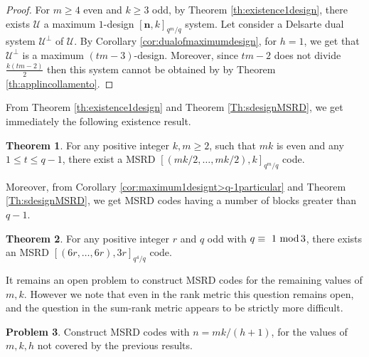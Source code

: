 \documentclass[11pt]{amsart}
\theoremstyle{definition}
\newtheorem{theorem}{Theorem}[section]
\newtheorem{open}[theorem]{Problem}
\newcommand{\U}{{\mathcal{U}}}
\newcommand{\bfn}{\mathbf {n}}
\renewcommand{\mod}{\hbox{{\rm mod}\,}}
\newcommand{\Fmnk}{[\bfn,k]_{q^m/q}}
\begin{document}
\begin{proof}
    For $m \geq 4$ even and $k \geq 3$ odd, by Theorem \ref{th:existence1design}, there exists $\U$ a maximum $1$-design $\Fmnk$ system. Let consider a Delsarte dual system $\mathcal{U}^{\perp}$ of $\U$. By Corollary \ref{cor:dualofmaximumdesign}, for $h=1$, we get that  $\mathcal{U}^{\perp}$ is a maximum $(tm-3)$-design. Moreover, since $tm-2$ does not divide $\frac{k(tm-2)}{2}$ then this system cannot be obtained by by Theorem \ref{th:applincollamento}.
\end{proof}

From Theorem \ref{th:existence1design} and Theorem \ref{Th:sdesignMSRD}, we get immediately the following existence result. %
\begin{theorem} 
    For any positive integer $k,m \geq 2$, such that $mk$ is even and any $1 \leq t \leq q-1$, there exist a MSRD $[(mk/2,\ldots,mk/2),k]_{q^m/q}$ code.
\end{theorem}

Moreover, from Corollary \ref{cor:maximum1designt>q-1particular} and Theorem \ref{Th:sdesignMSRD}, we get MSRD codes having a number of blocks greater than $q-1$.

\begin{theorem}
For any positive integer $r$ and $q$ odd with $q\equiv ~1~ \mod 3$, there exists an MSRD $[(6r,\ldots,6r),3r]_{q^4/q}$ code.
\end{theorem}



It remains an open problem to construct MSRD codes for the remaining values of $m,k$. However we note that even in the rank metric this question remains open, and the question in the sum-rank metric appears to be strictly more difficult.
\begin{open}
Construct MSRD codes with $n=mk/(h+1)$, for the values of $m,k,h$ not covered by the previous results.
\end{open} %

\medskip
\end{document}
